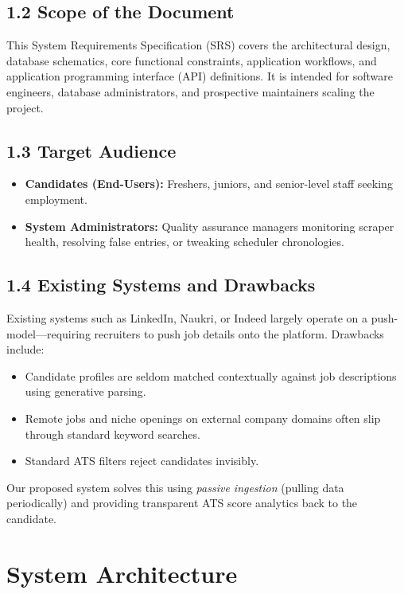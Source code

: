 \documentclass[12pt,a4paper,oneside]{report}
\begin{document}
\section{1.2 Scope of the Document}
This System Requirements Specification (SRS) covers the architectural design, database schematics, core functional constraints, application workflows, and application programming interface (API) definitions. It is intended for software engineers, database administrators, and prospective maintainers scaling the project.

\section{1.3 Target Audience}
\begin{itemize}
    \item \textbf{Candidates (End-Users):} Freshers, juniors, and senior-level staff seeking employment.
    \item \textbf{System Administrators:} Quality assurance managers monitoring scraper health, resolving false entries, or tweaking scheduler chronologies.
\end{itemize}

\section{1.4 Existing Systems and Drawbacks}
Existing systems such as LinkedIn, Naukri, or Indeed largely operate on a push-model—requiring recruiters to push job details onto the platform. 
Drawbacks include:
\begin{itemize}
    \item Candidate profiles are seldom matched contextually against job descriptions using generative parsing.
    \item Remote jobs and niche openings on external company domains often slip through standard keyword searches.
    \item Standard ATS filters reject candidates invisibly. 
\end{itemize}
Our proposed system solves this using \textit{passive ingestion} (pulling data periodically) and providing transparent ATS score analytics back to the candidate.

\chapter{System Architecture}
\end{document}
